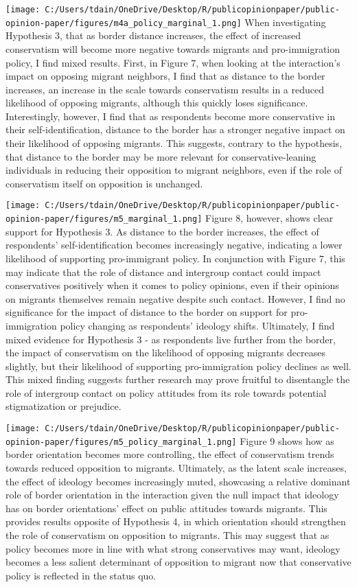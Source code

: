 \documentclass[12pt,]{article}
\begin{document}
\texttt{[image: C:/Users/tdain/OneDrive/Desktop/R/publicopinionpaper/public-opinion-paper/figures/m4a\_policy\_marginal\_1.png]}
When investigating Hypothesis 3, that as border distance increases, the
effect of increased conservatism will become more negative towards
migrants and pro-immigration policy, I find mixed results. First, in
Figure 7, when looking at the interaction's impact on opposing migrant
neighbors, I find that as distance to the border increases, an increase
in the scale towards conservatism results in a reduced likelihood of
opposing migrants, although this quickly loses significance.
Interestingly, however, I find that as respondents become more
conservative in their self-identification, distance to the border has a
stronger negative impact on their likelihood of opposing migrants. This
suggests, contrary to the hypothesis, that distance to the border may be
more relevant for conservative-leaning individuals in reducing their
opposition to migrant neighbors, even if the role of conservatism itself
on opposition is unchanged.

\texttt{[image: C:/Users/tdain/OneDrive/Desktop/R/publicopinionpaper/public-opinion-paper/figures/m5\_marginal\_1.png]}
Figure 8, however, shows clear support for Hypothesis 3. As distance to
the border increases, the effect of respondents' self-identification
becomes increasingly negative, indicating a lower likelihood of
supporting pro-immigrant policy. In conjunction with Figure 7, this may
indicate that the role of distance and intergroup contact could impact
conservatives positively when it comes to policy opinions, even if their
opinions on migrants themselves remain negative despite such contact.
However, I find no significance for the impact of distance to the border
on support for pro-immigration policy changing as respondents' ideology
shifts. Ultimately, I find mixed evidence for Hypothesis 3 - as
respondents live further from the border, the impact of conservatism on
the likelihood of opposing migrants decreases slightly, but their
likelihood of supporting pro-immigration policy declines as well. This
mixed finding suggests further research may prove fruitful to
disentangle the role of intergroup contact on policy attitudes from its
role towards potential stigmatization or prejudice.

\texttt{[image: C:/Users/tdain/OneDrive/Desktop/R/publicopinionpaper/public-opinion-paper/figures/m5\_policy\_marginal\_1.png]}
Figure 9 shows how as border orientation becomes more controlling, the
effect of conservatism trends towards reduced opposition to migrants.
Ultimately, as the latent scale increases, the effect of ideology
becomes increasingly muted, showcasing a relative dominant role of
border orientation in the interaction given the null impact that
ideology has on border orientations' effect on public attitudes towards
migrants. This provides results opposite of Hypothesis 4, in which
orientation should strengthen the role of conservatism on opposition to
migrants. This may suggest that as policy becomes more in line with what
strong conservatives may want, ideology becomes a less salient
determinant of opposition to migrant now that conservative policy is
reflected in the status quo.
\end{document}
